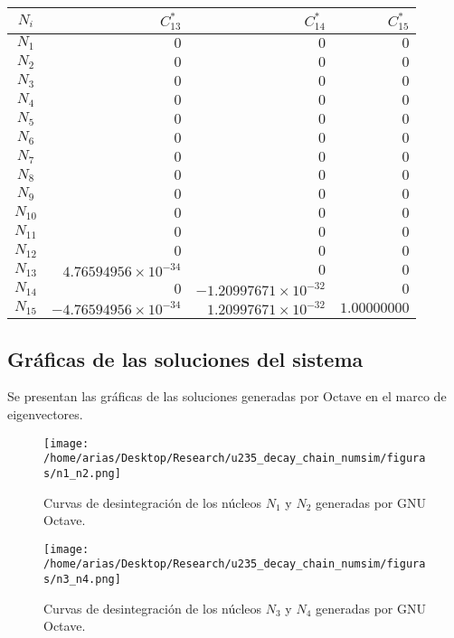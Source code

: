 \begin{center}
	\begin{tabular}[h]{|c|r|r|r|}
		\hline
		$N_i$ & $C_{13}^*$ & $C_{14}^*$ & $C_{15}^*$ \\\hline\hline
		$N_1$ & $0$& $0$ & $0$ \\
		$N_2$ & $0$& $0$ & $0$ \\
		$N_3$ & $0$& $0$ & $0$ \\
		$N_4$ & $0$& $0$ & $0$ \\
		$N_5$ & $0$& $0$ & $0$ \\
		$N_6$ & $0$ & $0$ & $0$ \\
		$N_7$ & $0$ & $0$ & $0$ \\
		$N_8$ & $0$ & $0$ & $0$ \\
		$N_9$ & $0$ & $0$ & $0$ \\
		$N_{10}$ & $0$ & $0$ & $0$ \\
		$N_{11}$ & $0$ & $0$ & $0$ \\
		$N_{12}$ & $0$ & $0$ & $0$ \\
		$N_{13}$ & $4.76594956\times 10^{-34}$ & $0$ & $0$ \\
		$N_{14}$ & $0$ & $-1.20997671\times 10^{-32}$ & $0$ \\
		$N_{15}$ & $-4.76594956\times 10^{-34}$& $1.20997671\times 10^{-32}$ & $1.00000000$ \\
		\hline
	\end{tabular}
	\label{tabla_coeficientes_bateman4}
\end{center}

\subsection{Gráficas de las soluciones del sistema}
Se presentan las gráficas de las soluciones generadas por Octave en el marco de eigenvectores. 

\begin{figure}[H]
	\centering
	\texttt{[image: /home/arias/Desktop/Research/u235\_decay\_chain\_numsim/figuras/n1\_n2.png]}\label{n1n2}\caption{Curvas de desintegración de los núcleos $N_1$ y $N_2$ generadas por GNU Octave.}
\end{figure}

\begin{figure}[H]
	\centering
	\texttt{[image: /home/arias/Desktop/Research/u235\_decay\_chain\_numsim/figuras/n3\_n4.png]}\label{n3n4}\caption{Curvas de desintegración de los núcleos $N_3$ y $N_4$ generadas por GNU Octave.}
\end{figure}

